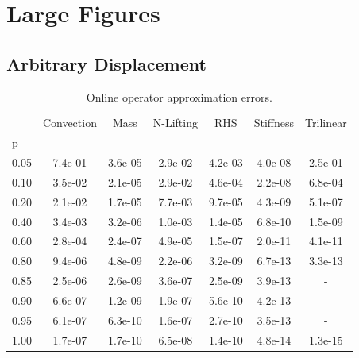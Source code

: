 \documentclass[../../thesis.tex]{subfiles}
\begin{document}
\section{Large Figures}


\subsection{Arbitrary Displacement}

\begin{table}[h]
    \centering
    \caption{Online operator approximation errors.}
    \begin{tabular}{lcccccc}
        \toprule
        {} &  Convection &    Mass &  N-Lifting &     RHS &  Stiffness &  Trilinear   \\
        p    &             &         &                    &         &            &            \\
        \midrule
        0.05 &     7.4e-01 & 3.6e-05 &            2.9e-02 & 4.2e-03 &    4.0e-08 &    2.5e-01 \\
        0.10 &     3.5e-02 & 2.1e-05 &            2.9e-02 & 4.6e-04 &    2.2e-08 &    6.8e-04 \\
        0.20 &     2.1e-02 & 1.7e-05 &            7.7e-03 & 9.7e-05 &    4.3e-09 &    5.1e-07 \\
        0.40 &     3.4e-03 & 3.2e-06 &            1.0e-03 & 1.4e-05 &    6.8e-10 &    1.5e-09 \\
        0.60 &     2.8e-04 & 2.4e-07 &            4.9e-05 & 1.5e-07 &    2.0e-11 &    4.1e-11 \\
        0.80 &     9.4e-06 & 4.8e-09 &            2.2e-06 & 3.2e-09 &    6.7e-13 &    3.3e-13 \\
        0.85 &     2.5e-06 & 2.6e-09 &            3.6e-07 & 2.5e-09 &    3.9e-13 &        -   \\
        0.90 &     6.6e-07 & 1.2e-09 &            1.9e-07 & 5.6e-10 &    4.2e-13 &        -   \\
        0.95 &     6.1e-07 & 6.3e-10 &            1.6e-07 & 2.7e-10 &    3.5e-13 &        -   \\
        1.00 &     1.7e-07 & 1.7e-10 &            6.5e-08 & 1.4e-10 &    4.8e-14 &    1.3e-15 \\
        \bottomrule
    \end{tabular}       
    \label{tab:arbitrary_displacement_errors_online}
\end{table}
\end{document}
